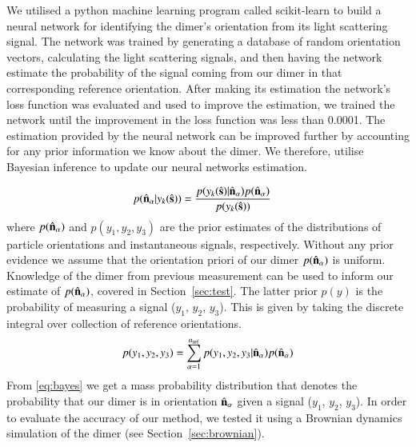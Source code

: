 \documentclass[final,  3p]{elsarticle}
\begin{document}
We utilised a python machine learning program called scikit-learn to build a neural network for identifying the dimer's orientation from its light scattering signal. The network was trained by generating a database of random orientation vectors, calculating the light scattering signals, and then having the network estimate the probability of the signal coming from our dimer in that corresponding reference orientation. After making its estimation the network's loss function was evaluated and used to improve the estimation, we trained the network until the improvement in the loss function was less than 0.0001. 
%
The estimation provided by the neural network can be improved further by accounting for any prior information we know about the dimer. We therefore, utilise Bayesian inference to update our neural networks estimation. 

\begin{align}
  \label{eq:bayes}
  p(\hat{\bf n}_\alpha| y_k(\hat{\bf s}))
  &=
    \frac{p(y_k(\hat{\bf s})|\hat{\bf n}_\alpha)
    p(\hat{\bf n}_\alpha)}{p(y_k(\hat{\bf s}))}
\end{align}
where $p(\hat{\bf n}_\alpha)$ and $p(y_1, y_2, y_3)$ are the prior estimates of the distributions of particle orientations and instantaneous signals, respectively.
%
Without any prior evidence we assume that the orientation priori of our dimer
$p(\hat{\bf n}_{\alpha})$ is uniform. Knowledge of the dimer from previous
measurement can be used to inform our estimate of $p(\hat{\bf n}_{\alpha})$, covered in Section~\ref{sec:test}.  The latter prior $p(y)$ is the probability of measuring a signal ($y_1$, $y_2$, $y_3$).  This is given by taking the discrete integral over collection of reference orientations.
\begin{align}
  p(y_1, y_2, y_3)
  =
  \sum_{\alpha=1}^{n_{\rm ref}}
  p(y_1, y_2, y_3|\hat{\bf n}_\alpha)
  p(\hat{\bf n}_\alpha)
\end{align}
From \eqref{eq:bayes} we get a mass probability distribution that denotes the
probability that our dimer is in orientation $\hat{\bf n}_{\alpha}$ given a
signal ($y_1$, $y_2$, $y_3$). In order to evaluate the accuracy of our method, we tested it using a Brownian dynamics simulation of the dimer (see Section~\ref{sec:brownian}).

\end{document}
